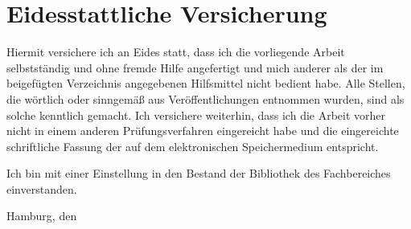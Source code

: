 \chapter*{Eidesstattliche Versicherung}
\thispagestyle{empty}

Hiermit versichere ich an Eides statt, dass ich die vorliegende Arbeit selbstständig und ohne fremde Hilfe angefertigt und mich anderer als der im beigefügten Verzeichnis angegebenen Hilfsmittel nicht bedient habe.
Alle Stellen, die wörtlich oder sinngemäß aus Veröffentlichungen entnommen wurden, sind als solche kenntlich gemacht. 
Ich versichere weiterhin, dass ich die Arbeit vorher nicht in einem anderen Prüfungsverfahren eingereicht habe und die eingereichte schriftliche Fassung der auf dem elektronischen Speichermedium entspricht.

\noindent Ich bin mit einer Einstellung in den Bestand der Bibliothek des Fachbereiches einverstanden.

\vspace{2cm} 

\noindent Hamburg, den
